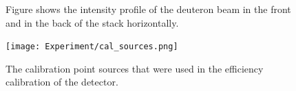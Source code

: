 \documentclass[a4paper,11pt,twoside]{book}
\begin{document}
\begin{figure}%
    \centering
    
    \quad
    \caption{Figure shows the intensity profile of the deuteron beam in the front and in the back of the stack horizontally.}%
    \label{fig:beamprofile}%
\end{figure}


\begin{figure}
    \centering
    \texttt{[image: Experiment/cal\_sources.png]}
    \caption{The calibration point sources that were used in the efficiency calibration of the detector.}
    \label{fig:calsources}
\end{figure}
\end{document}
